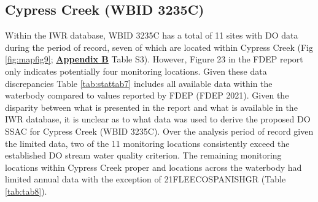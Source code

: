 \documentclass[]{interact}
\theoremstyle{plain}%
\theoremstyle{definition}
\theoremstyle{remark}
\begin{document}
\hypertarget{cypress-creek-wbid-3235c}{%
\subsection{Cypress Creek (WBID 3235C)}\label{cypress-creek-wbid-3235c}}

Within the IWR database, WBID 3235C has a total of 11 sites with DO data
during the period of record, seven of which are located within Cypress
Creek (Fig \ref{fig:mapfig9};
\textbf{\protect\hyperlink{appendix-b}{Appendix B}} Table S3). However,
Figure 23 in the FDEP report only indicates potentially four monitoring
locations. Given these data discrepancies Table \ref{tab:stattab7}
includes all available data within the waterbody compared to values
reported by FDEP (FDEP 2021). Given the disparity between what is
presented in the report and what is available in the IWR database, it is
unclear as to what data was used to derive the proposed DO SSAC for
Cypress Creek (WBID 3235C). Over the analysis period of record given the
limited data, two of the 11 monitoring locations consistently exceed the
established DO stream water quality criterion. The remaining monitoring
locations within Cypress Creek proper and locations across the waterbody
had limited annual data with the exception of 21FLEECOSPANISHGR (Table
\ref{tab:tab8}).

\begin{table}[H]

\caption{\label{tab:unnamed-chunk-14}\label{tab:stattab7} Summary statisic of dissolved oxygen (DO) saturation for Cypress Creek (WBID 3235C) during the period of record (Calendar Year: 2006 - 2020) as reported by FDEP (2021) and summaried data (this report)}
\centering
{}
\end{table}
\end{document}
